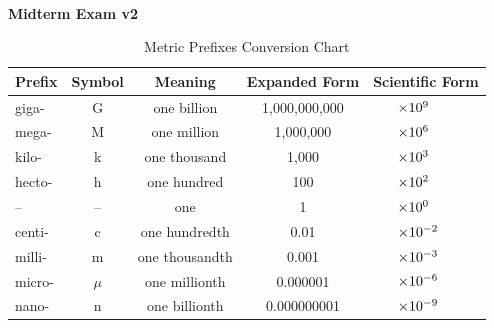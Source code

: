

\addpoints
\noprintanswers




\begin{centering}
\noindent\textbf{\\\Large Midterm Exam v2\\} 
\end{centering}

\qsp
{}
\qsp


\begin{table}[h!]
\centering

\begin{tabular}{l c c c l}
\toprule
\textbf{Prefix} & \textbf{Symbol} & \textbf{Meaning} & \textbf{Expanded Form} & \textbf{Scientific Form}\\
\midrule
giga- & G & one billion & 1,000,000,000 & $\hspace{4ex}\times 10^{9}$\\ 
mega- & M & one million & 1,000,000 & $\hspace{4ex}\times 10^{6}$\\ 
kilo- & k & one thousand & 1,000 & $\hspace{4ex}\times 10^{3}$\\ 
hecto- & h & one hundred & 100 & $\hspace{4ex}\times 10^{2}$\\ 
-- & -- & one & 1 & $\hspace{4ex}\times 10^{0}$\\ 
centi- & c & one hundredth & 0.01 & $\hspace{4ex}\times 10^{-2}$\\ 
milli- & m & one thousandth & 0.001 & $\hspace{4ex}\times 10^{-3}$\\ 
micro- & $\mu$ & one millionth & 0.000001 & $\hspace{4ex}\times 10^{-6}$\\ 
nano- & n & one billionth & 0.000000001 & $\hspace{4ex}\times 10^{-9}$\\ 
\bottomrule
\end{tabular}
\captionsetup{font=small, labelfont=bf}
\caption{Metric Prefixes Conversion Chart}
\end{table}


